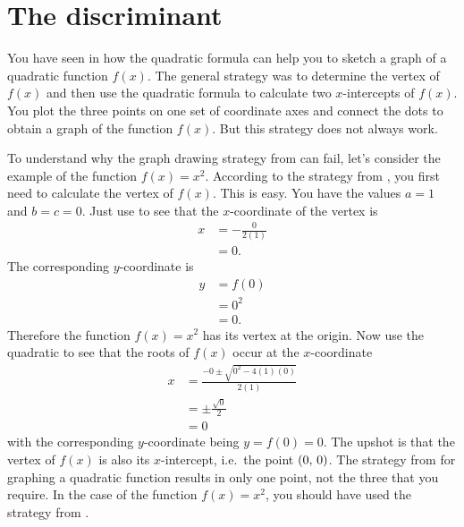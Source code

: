 \documentclass[a4paper,oneside,12pt]{article}
\begin{document}

\section{The discriminant}

You have seen in  how the quadratic
formula can help you to sketch a graph of a quadratic function $f(x)$.
The general strategy was to determine the vertex of $f(x)$ and then
use the quadratic formula to calculate two $x$-intercepts of $f(x)$.
You plot the three points on one set of coordinate axes and connect
the dots to obtain a graph of the function $f(x)$.  But this strategy
does not always work.

To understand why the graph drawing strategy
from  can fail, let's consider the
example of the function $f(x) = x^2$.  According to the strategy
from , you first need to calculate the
vertex of $f(x)$.  This is easy.  You have the values $a = 1$ and
$b = c = 0$.  Just use  to see
that the $x$-coordinate of the vertex is
\begin{align*}
x
&=
-\frac{0}{2(1)} \\[4pt]
&=
0.
\end{align*}
The corresponding $y$-coordinate is
\begin{align*}
y
&=
f(0) \\[4pt]
&=
0^2 \\[4pt]
&=
0.
\end{align*}
Therefore the function $f(x) = x^2$ has its vertex at the origin.  Now
use the quadratic  to see that the
roots of $f(x)$ occur at the $x$-coordinate
\begin{align*}
x
&=
\frac{
  -0 \pm \sqrt{0^2 - 4(1)(0)}
}{
  2(1)
} \\[4pt]
&=
\pm
\frac{
  \sqrt{0}
}{
  2
} \\[4pt]
&=
0
\end{align*}
with the corresponding $y$-coordinate being $y = f(0) = 0$.  The
upshot is that the vertex of $f(x)$ is also its $x$-intercept,
i.e.~the point $\left\lparen{0},\, {0}\right\rparen$.  The strategy
from  for graphing a quadratic function
results in only one point, not the three that you require.  In the
case of the function $f(x) = x^2$, you should have used the strategy
from .
\end{document}
